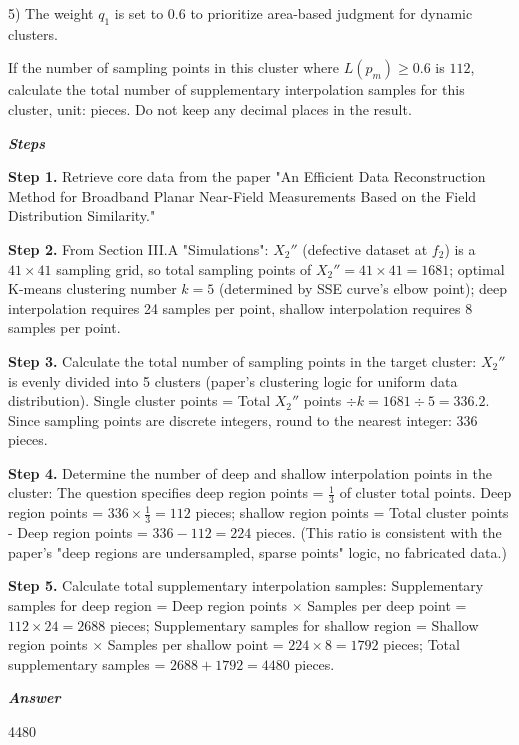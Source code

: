 \begin{tcolorbox}[
    breakable,
    title=Example of Scientific Deep Research in Information,
    colback=LighterGray,
    colframe=DeepPurple,
    colbacktitle=DeepPurple,
    coltitle=White,
]
5) The weight \(q_1\) is set to \(0.6\) to prioritize area-based judgment for dynamic clusters. 

If the number of sampling points in this cluster where \(L(p_m) \geq 0.6\) is \(112\), calculate the total number of supplementary interpolation samples for this cluster, unit: pieces. Do not keep any decimal places in the result.

\textbf{\emph{\textcolor{DeepPurple}{Steps}}}

\textbf{\textcolor{CaseOrange}{Step 1.}} Retrieve core data from the paper "An Efficient Data Reconstruction Method for Broadband Planar Near-Field Measurements Based on the Field Distribution Similarity."

\textbf{\textcolor{CaseOrange}{Step 2.}} From Section III.A "Simulations": \( X_2'' \) (defective dataset at \( f_2 \)) is a \( 41 \times 41 \) sampling grid, so total sampling points of \( X_2'' = 41 \times 41 = 1681 \); optimal K-means clustering number \( k=5 \) (determined by SSE curve's elbow point); deep interpolation requires 24 samples per point, shallow interpolation requires 8 samples per point.

\textbf{\textcolor{CaseOrange}{Step 3.}} Calculate the total number of sampling points in the target cluster: \( X_2'' \) is evenly divided into 5 clusters (paper's clustering logic for uniform data distribution). Single cluster points = Total \( X_2'' \) points \( \div k = 1681 \div 5 = 336.2 \). Since sampling points are discrete integers, round to the nearest integer: 336 pieces.

\textbf{\textcolor{CaseOrange}{Step 4.}} Determine the number of deep and shallow interpolation points in the cluster: The question specifies deep region points = \( \frac{1}{3} \) of cluster total points. Deep region points = \( 336 \times \frac{1}{3} = 112 \) pieces; shallow region points = Total cluster points - Deep region points = \( 336 - 112 = 224 \) pieces. (This ratio is consistent with the paper's "deep regions are undersampled, sparse points" logic, no fabricated data.)

\textbf{\textcolor{CaseOrange}{Step 5.}} Calculate total supplementary interpolation samples: Supplementary samples for deep region = Deep region points \(\times\) Samples per deep point = \( 112 \times 24 = 2688 \) pieces; Supplementary samples for shallow region = Shallow region points \(\times\) Samples per shallow point = \( 224 \times 8 = 1792 \) pieces; Total supplementary samples = \( 2688 + 1792 = 4480 \) pieces.


\textbf{\emph{\textcolor{DeepPurple}{Answer}}}

4480

\end{tcolorbox}

